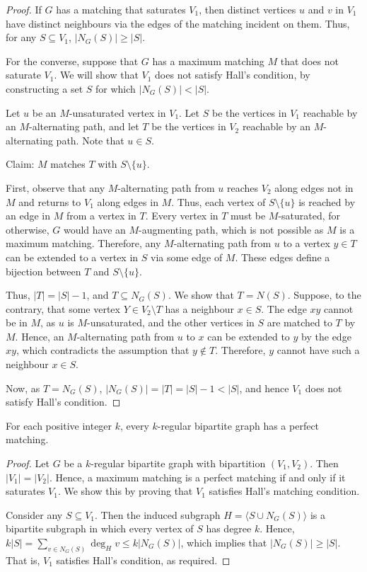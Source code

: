 \begin{proof}
If $G$ has a matching that saturates $V_1$, then distinct vertices $u$ and $v$ in $V_1$ have distinct neighbours via the edges of the matching incident on them. Thus, for any $S \subseteq V_1$, $|N_G(S)| \ge |S|$.

For the converse, suppose that $G$ has a maximum matching $M$ that does not saturate $V_1$. We will show that $V_1$ does not satisfy Hall's condition, by constructing a set $S$ for which $|N_G(S)| < |S|$.

Let $u$ be an $M$-unsaturated vertex in $V_1$. Let $S$ be the vertices in $V_1$ reachable by an $M$-alternating path, and let $T$ be the vertices in $V_2$ reachable by an $M$-alternating path. Note that $u \in S$.

\noindent Claim: $M$ matches $T$ with $S \setminus \{u\}$.

First, observe that any $M$-alternating path from $u$ reaches $V_2$ along edges not in $M$ and returns to $V_1$ along edges in $M$. Thus, each vertex of $S \setminus \{u\}$ is reached by an edge in $M$ from a vertex in $T$. Every vertex in $T$ must be $M$-saturated, for otherwise, $G$ would have an $M$-augmenting path, which is not possible as $M$ is a maximum matching. Therefore, any $M$-alternating path from $u$ to a vertex $y \in T$ can be extended to a vertex in $S$ via some edge of $M$. These edges define a bijection between $T$ and $S \setminus \{u\}$.

Thus, $|T| = |S| - 1$, and $T \subseteq N_G(S)$. We show that $T = N(S)$. Suppose, to the contrary, that some vertex $Y \in V_2 \setminus T$ has a neighbour $x \in S$. The edge $xy$ cannot be in $M$, as $u$ is $M$-unsaturated, and the other vertices in $S$ are matched to $T$ by $M$. Hence, an $M$-alternating path from $u$ to $x$ can be extended to $y$ by the edge $xy$, which contradicts the assumption that $y \notin T$. Therefore, $y$ cannot have such a neighbour $x \in S$.

Now, as $T = N_G(S)$, $|N_G(S)| = |T| = |S| - 1 < |S|$, and hence $V_1$ does not satisfy Hall's condition.
\end{proof}

\begin{Corollary}\label{cor:k-regBipartitePM}
For each positive integer $k$, every $k$-regular bipartite graph has a perfect matching.
\end{Corollary}

\begin{proof}
Let $G$ be a $k$-regular bipartite graph with bipartition $(V_1, V_2)$. Then $|V_1| = |V_2|$. Hence, a maximum matching is a perfect matching if and only if it saturates $V_1$. We show this by proving that $V_1$ satisfies Hall's matching condition.

Consider any $S \subseteq V_1$. Then the induced subgraph $H = \langle S \cup N_G(S) \rangle$ is a bipartite subgraph in which every vertex of $S$ has degree $k$. Hence, $k|S| = \sum_{v \in N_G(S)} \deg_H v \le k|N_G(S)|$, which implies that $|N_G(S)| \ge |S|$. That is, $V_1$ satisfies Hall's condition, as required.
\end{proof}


